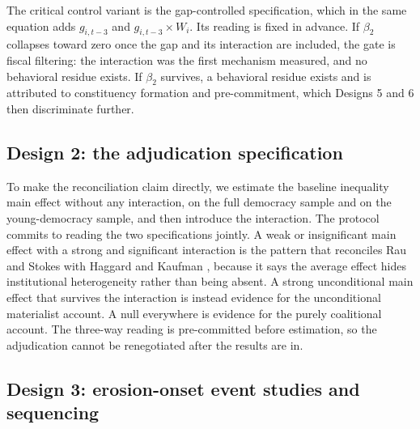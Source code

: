 \documentclass[11pt,letterpaper]{article}
\begin{document}
The critical control variant is the gap-controlled specification, which in the same equation adds $g_{i,t-3}$ and $g_{i,t-3} \times W_i$. Its reading is fixed in advance. If $\beta_2$ collapses toward zero once the gap and its interaction are included, the gate is fiscal filtering: the interaction was the first mechanism measured, and no behavioral residue exists. If $\beta_2$ survives, a behavioral residue exists and is attributed to constituency formation and pre-commitment, which Designs 5 and 6 then discriminate further.

\subsection{Design 2: the adjudication specification}

To make the reconciliation claim directly, we estimate the baseline inequality main effect without any interaction, on the full democracy sample and on the young-democracy sample, and then introduce the interaction. The protocol commits to reading the two specifications jointly. A weak or insignificant main effect with a strong and significant interaction is the pattern that reconciles Rau and Stokes with Haggard and Kaufman \citep{RauStokes2025, HaggardKaufman2021}, because it says the average effect hides institutional heterogeneity rather than being absent. A strong unconditional main effect that survives the interaction is instead evidence for the unconditional materialist account. A null everywhere is evidence for the purely coalitional account. The three-way reading is pre-committed before estimation, so the adjudication cannot be renegotiated after the results are in.

\subsection{Design 3: erosion-onset event studies and sequencing}
\end{document}
